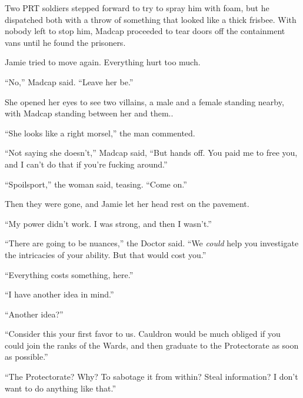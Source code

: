 Two PRT soldiers stepped forward to try to spray him with foam, but he dispatched both with a throw of something that looked like a thick frisbee.  With nobody left to stop him, Madcap proceeded to tear doors off the containment vans until he found the prisoners.



Jamie tried to move again.  Everything hurt too much.



``No,'' Madcap said.  ``Leave her be.''



She opened her eyes to see two villains, a male and a female standing nearby, with Madcap standing between her and them..



``She looks like a right morsel,'' the man commented.



``Not saying she doesn't,'' Madcap said, ``But hands off.  You paid me to free you, and I can't do that if you're fucking around.''



``Spoilsport,'' the woman said, teasing.  ``Come on.''



Then they were gone, and Jamie let her head rest on the pavement.



\sectionbreak



``My power didn't work.  I was strong, and then I wasn't.''



``There are going to be nuances,'' the Doctor said.  ``We \emph{could} help you investigate the intricacies of your ability.  But that would cost you.''



``Everything costs something, here.''



``I have another idea in mind.''



``Another idea?''



``Consider this your first favor to us.  Cauldron would be much obliged if you could join the ranks of the Wards, and then graduate to the Protectorate as soon as possible.''



``The Protectorate?  Why?  To sabotage it from within?  Steal information?  I don't want to do anything like that.''



